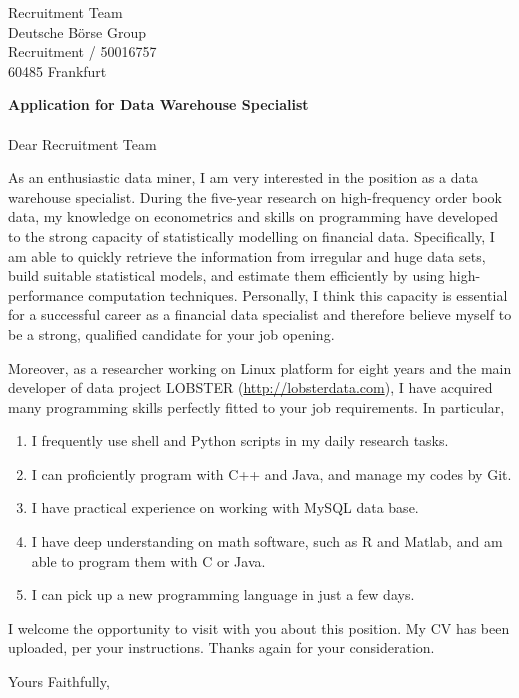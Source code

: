 \documentclass[a4paper, 11pt]{letter}
\begin{document}
 
\begin{letter}{%
Recruitment Team\\
Deutsche B{\"o}rse Group\\
Recruitment / 50016757 \\
60485 Frankfurt} 
\opening{\textbf{\large{Application for Data Warehouse Specialist}}\\
\vspace{-5pt}\\ Dear Recruitment Team}
As an enthusiastic data miner, I am very interested in the position as a data warehouse specialist. During the five-year research on high-frequency order book data, my knowledge on econometrics and skills on programming have developed to the strong capacity of statistically modelling on financial data. Specifically, I am able to quickly retrieve the information from irregular and huge data sets, build suitable statistical models, and estimate them efficiently by using high-performance computation techniques. Personally, I think this capacity is essential for a successful career as a financial data specialist and therefore believe myself to be a strong, qualified candidate for your job opening.     

Moreover, as a researcher working on Linux platform for eight years and the main developer of data project LOBSTER (\url{http://lobsterdata.com}), I have acquired many programming skills perfectly fitted to your job requirements. In particular, 
\begin{enumerate}
  \item I frequently use shell and Python scripts in my daily research tasks.
  \item I can proficiently program with C++ and Java, and manage my codes by Git.
  \item I have practical experience on working with MySQL data base.
  \item I have deep understanding on math software, such as R and Matlab, and am able to program them with C or Java.
  \item I can pick up a new programming language in just a few days.
\end{enumerate}
I welcome the opportunity to visit with you about this position. My CV has been uploaded, per your instructions. Thanks again for your consideration.
 
\closing{Yours Faithfully,}
 
 
\end{letter}
 
\end{document}
